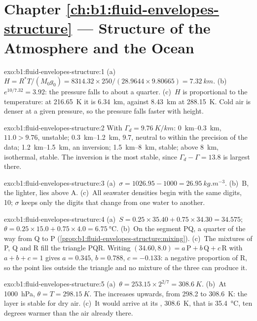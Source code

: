 \section*{Chapter \ref{ch:b1:fluid-envelopes-structure} --- Structure of the Atmosphere and the Ocean}

\begin{solution}{exo:b1:fluid-envelopes-structure:1}
(a)~$H = R^*T/(M_0 g_0) = 8314.32 \times 250/(28.9644 \times 9.80665) =
\qty{7.32}{km}$. (b)~$e^{10/7.32} = 3.92$: the pressure falls to about a quarter.
(c)~$H$ is proportional to the temperature: at \qty{216.65}{K} it is
\qty{6.34}{km}, against \qty{8.43}{km} at \qty{288.15}{K}. Cold air is denser at
a given pressure, so the pressure falls faster with height.
\end{solution}

\begin{solution}{exo:b1:fluid-envelopes-structure:2}
With $\Gamma_d = \qty{9.76}{K/km}$: \qtyrange{0}{0.3}{km}, $11.0 > 9.76$,
unstable; \qtyrange{0.3}{1.2}{km}, $9.7$, neutral to within the precision of the
data; \qtyrange{1.2}{1.5}{km}, an inversion; \qtyrange{1.5}{8}{km}, stable;
above \qty{8}{km}, isothermal, stable. The inversion is the most stable, since
$\Gamma_d - \Gamma = 13.8$ is largest there.
\end{solution}

\begin{solution}{exo:b1:fluid-envelopes-structure:3}
(a)~$\sigma = 1026.95 - 1000 = \qty{26.95}{kg.m^{-3}}$. (b)~B, the lighter, lies
above A. (c)~All seawater densities begin with the same digits, 10; $\sigma$ keeps
only the digits that change from one water to another.
\end{solution}

\begin{solution}{exo:b1:fluid-envelopes-structure:4}
(a)~$S = 0.25 \times 35.40 + 0.75 \times 34.30 = 34.575$; $\theta = 0.25 \times
15.0 + 0.75 \times 4.0 = \qty{6.75}{\celsius}$. (b)~On the segment PQ, a quarter
of the way from Q to P (\cref{prop:b1:fluid-envelopes-structure:mixing}).
(c)~The mixtures of P, Q and R fill the triangle PQR. Writing
$(34.60, 8.0) = a\,\mathrm P + b\,\mathrm Q + c\,\mathrm R$ with $a + b + c = 1$
gives $a = 0.345$, $b = 0.788$, $c = -0.133$: a negative proportion of R, so the
point lies outside the triangle and no mixture of the three can produce it.
\end{solution}

\begin{solution}{exo:b1:fluid-envelopes-structure:5}
(a)~$\theta = 253.15 \times 2^{2/7} = \qty{308.6}{K}$. (b)~At \qty{1000}{hPa},
$\theta = T = \qty{298.15}{K}$. The  increases upwards, from
298.2 to \qty{308.6}{K}: the layer is stable for dry air. (c)~It would arrive at
its , \qty{308.6}{K}, that is \qty{35.4}{\celsius}, ten
degrees warmer than the air already there.
\end{solution}

